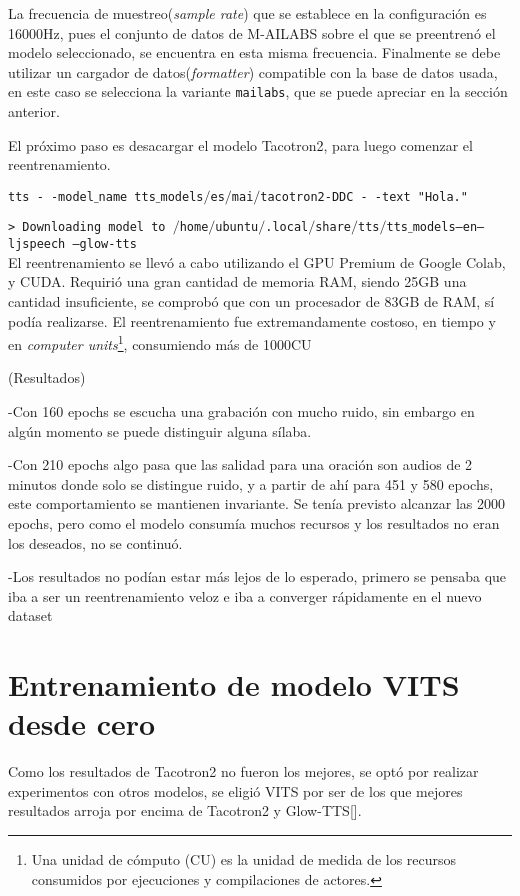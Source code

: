 La frecuencia de muestreo(\textit{sample rate}) que se establece en la configuración es 16000Hz, pues el conjunto de datos de M-AILABS sobre el que se preentrenó el modelo seleccionado, se encuentra en esta misma frecuencia. Finalmente se debe utilizar un cargador de datos(\textit{formatter}) compatible con la base de datos usada, en este caso se selecciona la variante \texttt{mailabs}, que se puede apreciar en la sección anterior.

El próximo paso es desacargar el modelo Tacotron2, para luego comenzar el reentrenamiento.

\texttt{tts - -model$\_$name tts$\_$models$/$es$/$mai$/$tacotron2-DDC - -text "Hola."}

\texttt{> Downloading model to $/$home$/$ubuntu$/$.local$/$share$/$tts$/$tts$\_$models--en--ljspeech
	--glow-tts}\\

El reentrenamiento se llevó a cabo utilizando el GPU Premium de Google Colab, y CUDA. Requirió una gran cantidad de memoria RAM, siendo 25GB una cantidad insuficiente, se comprobó que con un procesador de 83GB de RAM, sí podía realizarse. El reentrenamiento fue extremandamente costoso, en tiempo y en \textit{computer units}\footnote{Una unidad de cómputo (CU) es la unidad de medida de los recursos consumidos por ejecuciones y compilaciones de actores.}, consumiendo más de 1000CU

(Resultados)

-Con 160 epochs se escucha una grabación con mucho ruido, sin embargo en algún momento se puede distinguir alguna sílaba.

-Con 210 epochs algo pasa que las salidad para una oración son audios de 2 minutos donde solo se distingue ruido, y a partir de ahí para 451 y 580 epochs, este comportamiento se mantienen invariante. Se tenía previsto alcanzar las 2000 epochs, pero como el modelo consumía muchos recursos y los resultados no eran los deseados, no se continuó.

-Los resultados no podían estar más lejos de lo esperado, primero se pensaba que iba a ser un reentrenamiento veloz e iba a converger rápidamente en el nuevo dataset 

\section{Entrenamiento de modelo VITS desde cero}
Como los resultados de Tacotron2 no fueron los mejores, se optó por realizar experimentos con otros modelos, se eligió VITS por ser de los que mejores resultados arroja por encima de Tacotron2 y Glow-TTS[\cite{kim2021conditional}].

